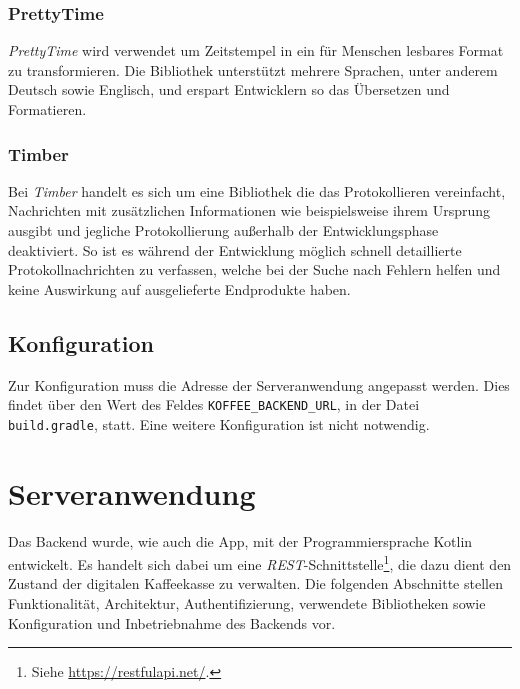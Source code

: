 \documentclass[a4paper, 11pt]{article}
\begin{document}
\subsubsection{PrettyTime}
\label{subsubsec:app:bibs:prettytime}
\textit{PrettyTime} wird verwendet um Zeitstempel in ein für Menschen lesbares Format zu transformieren.
Die Bibliothek unterstützt mehrere Sprachen, unter anderem Deutsch sowie Englisch, und erspart Entwicklern so das Übersetzen und Formatieren.

\subsubsection{Timber}
\label{subsubsec:app:bibs:timber}
Bei \textit{Timber} handelt es sich um eine Bibliothek die das Protokollieren vereinfacht, Nachrichten mit zusätzlichen Informationen wie beispielsweise ihrem Ursprung ausgibt und jegliche Protokollierung außerhalb der Entwicklungsphase deaktiviert.
So ist es während der Entwicklung möglich schnell detaillierte Protokollnachrichten zu verfassen, welche bei der Suche nach Fehlern helfen und keine Auswirkung auf ausgelieferte Endprodukte haben.

\subsection{Konfiguration}
\label{subsec:app:configuration}
Zur Konfiguration muss die Adresse der Serveranwendung angepasst werden.
Dies findet über den Wert des Feldes \verb|KOFFEE_BACKEND_URL|, in der Datei \verb|build.gradle|, statt.
Eine weitere Konfiguration ist nicht notwendig.

\section{Serveranwendung}
\label{sec:backend}
Das Backend wurde, wie auch die App, mit der Programmiersprache Kotlin entwickelt.
Es handelt sich dabei um eine \textit{REST}-Schnittstelle\footnote{Siehe \url{https://restfulapi.net/}.}, die dazu dient den Zustand der digitalen Kaffeekasse zu verwalten.
Die folgenden Abschnitte stellen Funktionalität, Architektur, Authentifizierung, verwendete Bibliotheken sowie Konfiguration und Inbetriebnahme des Backends vor.
\end{document}
